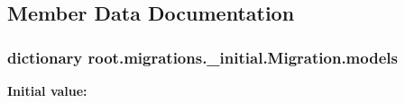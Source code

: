 \subsection{Member Data Documentation}
\hypertarget{classroot_1_1migrations_1_10001__initial_1_1_migration_ac9f282ca5eb3697057ec3c78480c77d7}{
\subsubsection[{models}]{\setlength{\rightskip}{0pt plus 5cm}dictionary root.\-migrations.\-\_\-initial.\-Migration.\-models\hspace{0.3cm}{\ttfamily [static]}}}\label{classroot_1_1migrations_1_10001__initial_1_1_migration_ac9f282ca5eb3697057ec3c78480c77d7}
{\bfseries Initial value\-:}

